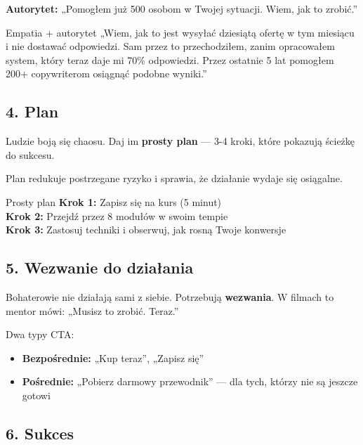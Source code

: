 \documentclass[
  12pt,
  a4paper,
  twoside,
  openright,
  12pt,
  DIV=12,
  BCOR=12mm]{scrbook}
\providecommand{\tightlist}{%
  \setlength{\itemsep}{0pt}\setlength{\parskip}{0pt}}\usepackage{longtable,booktabs,array}
\begin{document}
\textbf{Autorytet:} „Pomogłem już 500 osobom w Twojej sytuacji. Wiem,
jak to zrobić.''

\begin{przyklad}{Empatia + autorytet}
„Wiem, jak to jest wysyłać dziesiątą ofertę w tym miesiącu i nie dostawać odpowiedzi. Sam przez to przechodziłem, zanim opracowałem system, który teraz daje mi 70\% odpowiedzi. Przez ostatnie 5 lat pomogłem 200+ copywriterom osiągnąć podobne wyniki.”
\end{przyklad}

\subsection{4. Plan}\label{plan}

Ludzie boją się chaosu. Daj im \textbf{prosty plan} --- 3-4 kroki, które
pokazują ścieżkę do sukcesu.

Plan redukuje postrzegane ryzyko i sprawia, że działanie wydaje się
osiągalne.

\begin{przyklad}{Prosty plan}
\textbf{Krok 1:} Zapisz się na kurs (5 minut)\\
\textbf{Krok 2:} Przejdź przez 8 modułów w swoim tempie\\
\textbf{Krok 3:} Zastosuj techniki i obserwuj, jak rosną Twoje konwersje
\end{przyklad}

\subsection{5. Wezwanie do działania}\label{wezwanie-do-dziaux142ania}

Bohaterowie nie działają sami z siebie. Potrzebują \textbf{wezwania}. W
filmach to mentor mówi: „Musisz to zrobić. Teraz.''

Dwa typy CTA:

\begin{itemize}
\tightlist
\item
  \textbf{Bezpośrednie:} „Kup teraz'', „Zapisz się''
\item
  \textbf{Pośrednie:} „Pobierz darmowy przewodnik'' --- dla tych, którzy
  nie są jeszcze gotowi
\end{itemize}

\subsection{6. Sukces}\label{sukces}
\end{document}
